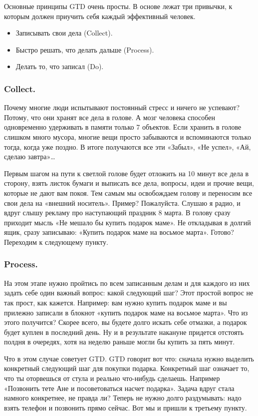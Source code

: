 Основные принципы GTD очень просты. В основе лежат три привычки, к которым должен приучить себя каждый эффективный человек.
\begin{itemize}
  \item Записывать свои дела (Collect).
  \item Быстро решать, что делать дальше (Process).
  \item Делать то, что записал (Do).
\end{itemize}


\subsubsection{Collect. }

Почему многие люди испытывают постоянный стресс и ничего не успевают? Потому, что они хранят все дела в голове. А мозг человека способен одновременно удерживать в памяти только 7 объектов. Если хранить в голове слишком много мусора, многие вещи просто забываются и вспоминаются только тогда, когда уже поздно. В итоге получаются все эти «Забыл», «Не успел», «Ай, сделаю завтра»…

Первым шагом на пути к светлой голове будет отложить на 10 минут все дела в сторону, взять листок бумаги и выписать все дела, вопросы, идеи и прочие вещи, которые не дают вам покоя. Тем самым мы освобождаем голову и переносим все свои дела на «внешний носитель».
Пример? Пожалуйста. Слушаю я радио, и вдруг слышу рекламу про наступающий праздник 8 марта. В голову сразу приходит мысль «Не мешало бы купить подарок маме». Не откладывая в долгий ящик, сразу записываю: «Купить подарок маме на восьмое марта».
Готово? Переходим к следующему пункту.

\subsubsection{Process. }

На этом этапе нужно пройтись по всем записанным делам и для каждого из них задать себе один важный вопрос: какой следующий шаг?
Этот простой вопрос не так прост, как кажется. Например: вам нужно купить подарок маме и вы прилежно записали в блокнот «купить подарок маме на восьмое марта».
Что из этого получится? Скорее всего, вы будете долго искать себе отмазки, а подарок будет куплен в последний день. Ну и в результате накануне придется отстоять полдня в очередях, хотя на неделю раньше могли бы купить за пять минут.

Что в этом случае советует GTD.
GTD говорит вот что: сначала нужно выделить конкретный следующий шаг для покупки подарка. Конкретный шаг означает то, что ты оторвешься от стула и реально что-нибудь сделаешь. Например «Позвонить тете Ане и посоветоваться насчет подарка». Задача вдруг стала намного конкретнее, не правда ли? Теперь не нужно долго раздумывать: надо взять телефон и позвонить прямо сейчас.
Вот мы и пришли к третьему пункту.

